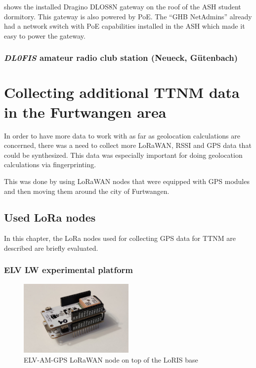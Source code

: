  shows the installed Dragino DLOS8N gateway on the roof of the \ac{ASH} student dormitory.
This gateway is also powered by \ac{PoE}.
The ``\ac{GHB} NetAdmins'' already had a network switch with \ac{PoE} capabilities installed in the \ac{ASH} which made it easy to power the gateway.

\subsubsection{\emph{DL0FIS} amateur radio club station (Neueck, Gütenbach)}

\section{Collecting additional \acf{TTNM} data in the Furtwangen area}\label{sec:collecting-additional-ttnm-data}

In order to have more data to work with as far as geolocation calculations are concerned, there was a need to collect more \ac{LoRaWAN}, \ac{RSSI} and \ac{GPS} data that could be synthesized.
This data was especially important for doing geolocation calculations via fingerprinting.

This was done by using \ac{LoRaWAN} nodes that were equipped with \ac{GPS} modules and then moving them around the city of Furtwangen.

\subsection{Used \acs{LoRa} nodes}

In this chapter, the \ac{LoRa} nodes used for collecting \ac{GPS} data for \ac{TTNM} are described are briefly evaluated.

\subsubsection{ELV LW experimental platform}

\begin{figure}
    \centering
    \includegraphics[width=0.5\textwidth]{pictures/hardware/gps-nodes/loris_bare.jpg}
    \caption{ELV-AM-GPS \ac{LoRaWAN} node on top of the LoRIS base\label{pic:loris-node-bare}}
\end{figure}

